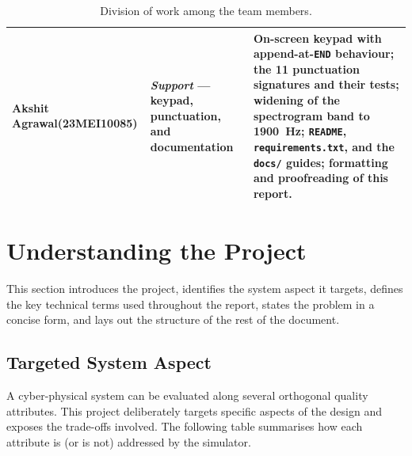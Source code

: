 \documentclass[11pt,a4paper]{article}
\begin{document}
\begin{table}[H]
\begin{tabular}{@{}p{3.2cm}p{3.3cm}p{8.0cm}@{}}
        \midrule
        Akshit Agrawal\newline (23MEI10085) &
        \emph{Support} --- keypad, punctuation, and documentation &
        On-screen keypad with append-at-\texttt{END} behaviour; the 11
        punctuation signatures and their tests; widening of the spectrogram
        band to 1900~Hz; \texttt{README}, \texttt{requirements.txt}, and the
        \texttt{docs/} guides; formatting and proofreading of this report. \\
        \bottomrule
    \end{tabular}
    \caption{Division of work among the team members.}
    \label{tab:roles}
\end{table}

\section{Understanding the Project}
\label{sec:understanding}

This section introduces the project, identifies the system aspect it targets,
defines the key technical terms used throughout the report, states the problem
in a concise form, and lays out the structure of the rest of the document.

\subsection{Targeted System Aspect}

A cyber-physical system can be evaluated along several orthogonal quality
attributes. This project deliberately targets specific aspects of the design
and exposes the trade-offs involved. The following table summarises how each
attribute is (or is not) addressed by the simulator.
\end{document}
